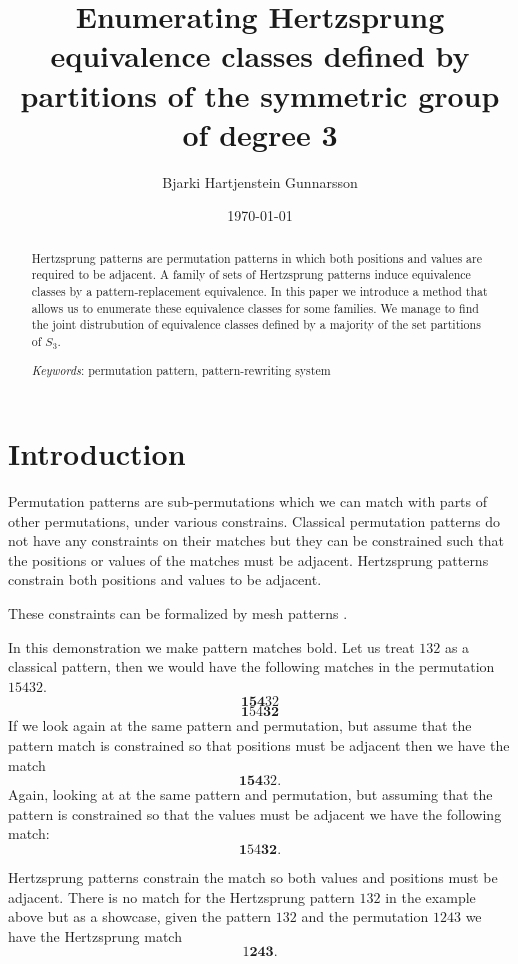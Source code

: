 \documentclass[a4paper, 11pt, english]{article}
\newcommand{\breath}{\vspace{6pt plus 2pt minus 1pt}\noindent}
\theoremstyle{definition}
\newcommand{\Sym}{S}
\begin{document}
\title{Enumerating Hertzsprung equivalence classes defined by partitions of the symmetric group of degree 3}
\author{Bjarki Hartjenstein Gunnarsson}
\date{\today}
\maketitle

\begin{abstract}
    Hertzsprung patterns are permutation patterns in which both positions and values are required to
    be adjacent. A family of sets of Hertzsprung patterns induce equivalence classes by
    a pattern-replacement equivalence. In this paper we introduce a method that allows us 
    to enumerate these equivalence classes for some families. We manage to find the joint
    distrubution of equivalence classes defined by a majority of the set partitions of $\Sym_3$.

    \breath \emph{Keywords}: permutation pattern, pattern-rewriting system
\end{abstract}

\section{Introduction}
Permutation patterns are sub-permutations which we can match with parts of other
permutations, under various constrains. 
Classical permutation patterns do not have any constraints on their matches but they can
be constrained such that the positions or values of the matches must be adjacent.
Hertzsprung patterns constrain both positions and values to be adjacent. 

These constraints can be formalized by mesh patterns \cite{claesson:2011}.

In this demonstration we make pattern matches bold.  Let us treat $132$ as a classical
pattern, then we would have the following matches in the permutation $15432$.
\[
    \bm{154}32
\]
\[
    \bm{1}54\bm{32}
\]
If we look again at the same pattern and permutation, but assume that the
pattern match is constrained so that positions must be adjacent then we have the match
\[
    \bm{154}32.
\]
Again, looking at at the same pattern and permutation, but assuming that the
pattern is constrained so that the values must be adjacent we have the following
match:
\[
    \bm{1}54\bm{32}.
\]

Hertzsprung patterns constrain the match so both values and positions must be
adjacent. There is no match for the Hertzsprung pattern $132$ in the example
above but as a showcase, given the pattern $132$ and the permutation $1243$ we
have the Hertzsprung match
\[
    1\bm{243}.
\]
\end{document}
